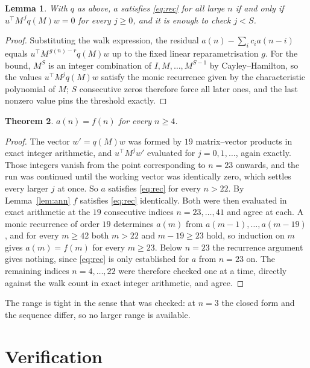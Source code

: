 \documentclass[11pt,a4paper]{article}
\theoremstyle{plain}
\newtheorem{theorem}{Theorem}
\newtheorem{lemma}[theorem]{Lemma}
\theoremstyle{definition}
\begin{document}
\begin{lemma}\label{lem:crit}
With $q$ as above, $a$ satisfies \eqref{eq:rec} for all large $n$ if and only if
$u^{\!\top}M^{\,j}q(M)w=0$ for every $j\ge0$, and it is enough to check $j<S$.
\end{lemma}

\begin{proof}
Substituting the walk expression, the residual $a(n)-\sum_ic_ia(n-i)$ equals
$u^{\!\top}M^{\,g(n)-r}q(M)w$ up to the fixed linear reparametrisation $g$. For the bound,
$M^{S}$ is an integer combination of $I,M,\dots,M^{S-1}$ by Cayley--Hamilton, so the values
$u^{\!\top}M^{j}q(M)w$ satisfy the monic recurrence given by the characteristic polynomial of
$M$; $S$ consecutive zeros therefore force all later ones, and the last nonzero value pins the
threshold exactly.
\end{proof}

\begin{theorem}
$a(n)=f(n)$ for every $n\ge4$.
\end{theorem}

\begin{proof}
The vector $w'=q(M)w$ was formed by $19$ matrix--vector products in exact integer
arithmetic, and $u^{\!\top}M^{j}w'$ evaluated for $j=0,1,\dots$, again exactly. Those integers
vanish from the point corresponding to $n=23$ onwards, and the run was continued until the
working vector was identically zero, which settles every larger $j$ at once. So $a$ satisfies
\eqref{eq:rec} for every $n>22$. By Lemma~\ref{lem:ann} $f$ satisfies \eqref{eq:rec}
identically. Both were then evaluated in exact arithmetic at the $19$ consecutive indices
$n=23,\dots,41$ and agree at each. A monic recurrence of order $19$
determines $a(m)$ from $a(m-1),\dots,a(m-19)$, and for every $m\ge42$ both
$m>22$ and $m-19\ge23$ hold, so induction on $m$ gives $a(m)=f(m)$ for every
$m\ge23$.
Below $n=23$ the recurrence argument gives nothing, since \eqref{eq:rec} is only
established for $a$ from $n=23$ on. The remaining indices $n=4,\dots,22$ were
therefore checked one at a time, directly against the walk count in exact integer arithmetic,
and agree.
\end{proof}

The range is tight in the sense that was checked: at $n=3$ the closed form and the sequence differ, so no larger range is available.

\section{Verification}
\end{document}
